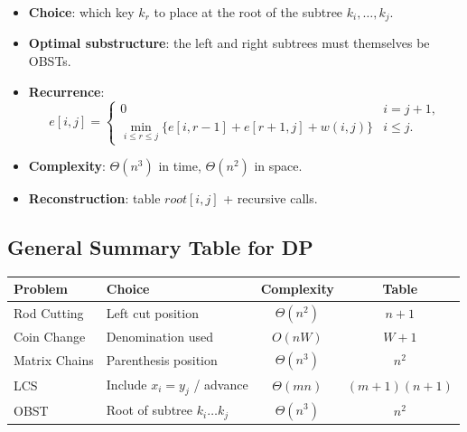 \begin{tcolorbox}[colback=lightblue, colframe=keyblue, fonttitle=\bfseries,
                  title={Summary DP – Optimal Binary Search Tree}]
\begin{itemize}[noitemsep]
  \item \textbf{Choice}: which key $k_r$ to place at the root of the subtree
        $k_i, \ldots, k_j$.
  \item \textbf{Optimal substructure}: the left and right subtrees must
        themselves be OBSTs.
  \item \textbf{Recurrence}:
    \[
      e[i,j] =
      \begin{cases}
        0 & i = j+1,\\
        \displaystyle\min_{i \le r \le j}
          \bigl\{e[i,r-1] + e[r+1,j] + w(i,j)\bigr\} & i \le j.
      \end{cases}
    \]
  \item \textbf{Complexity}: $\Theta(n^3)$ in time, $\Theta(n^2)$ in space.
  \item \textbf{Reconstruction}: table $\mathit{root}[i,j]$ + recursive calls.
\end{itemize}
\end{tcolorbox}

\subsection{General Summary Table for DP}

\begin{center}
\renewcommand{\arraystretch}{1.45}
\begin{tabular}{llcc}
\toprule
\textbf{Problem} & \textbf{Choice} & \textbf{Complexity} & \textbf{Table} \\
\midrule
Rod Cutting         & Left cut position                & $\Theta(n^2)$  & $n+1$ \\
Coin Change         & Denomination used                & $O(nW)$        & $W+1$ \\
Matrix Chains       & Parenthesis position             & $\Theta(n^3)$  & $n^2$ \\
LCS                 & Include $x_i = y_j$ / advance    & $\Theta(mn)$   & $(m+1)(n+1)$ \\
OBST                & Root of subtree $k_i\ldots k_j$  & $\Theta(n^3)$  & $n^2$ \\
\bottomrule
\end{tabular}
\end{center}